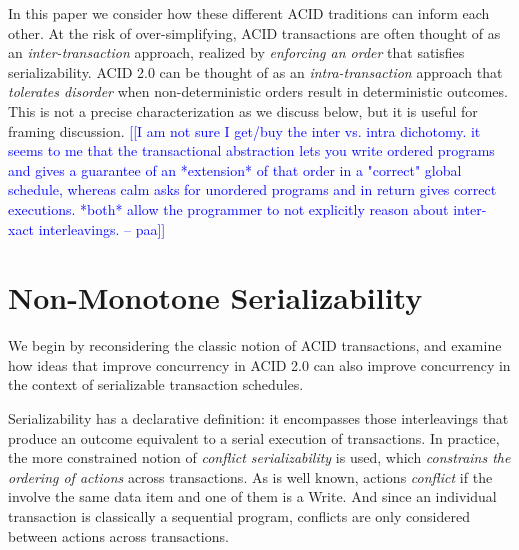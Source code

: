 \documentclass{sig-alternate}
\newcommand{\paa}[1]{{\textcolor{blue}{[[#1 -- paa]]}}}
\begin{document}
In this paper we consider how these different ACID traditions can inform each other.  At the risk of over-simplifying, ACID transactions are often thought of as an \emph{inter-transaction} approach, realized by \emph{enforcing an order} that satisfies serializability.  ACID 2.0 can be thought of as an \emph{intra-transaction} approach that \emph{tolerates disorder} when non-deterministic orders result in deterministic outcomes.  This is not a precise characterization as we discuss below, but it is useful for framing discussion.
\paa{I am not sure I get/buy the inter vs. intra dichotomy.  it seems to me that the transactional abstraction lets you write ordered programs and gives a guarantee of an *extension* of that order in a "correct" global schedule, whereas calm asks for unordered programs and in return gives correct executions.  *both* allow the programmer to not explicitly reason about inter-xact interleavings.}

\section{Non-Monotone Serializability}
We begin by reconsidering the classic notion of ACID transactions, and examine how ideas that improve concurrency in ACID 2.0 can also improve concurrency in the context of serializable transaction schedules.

Serializability has a declarative definition: it encompasses those interleavings that produce an outcome equivalent to a serial execution of transactions.  In practice, the more constrained notion of \emph{conflict serializability} is used, which \emph{constrains the ordering of actions} across transactions.  As is well known, actions \emph{conflict} if the involve the same data item and one of them is a Write.  And since an individual transaction is classically a sequential program, conflicts are only considered between actions across transactions.
\end{document}
